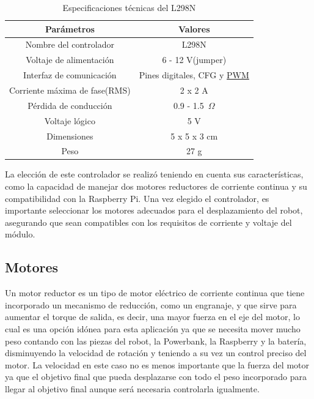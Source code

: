 \begin{table}[H]
\begin{center}
\begin{tabular}{|c|c|}
\hline
\textbf{Parámetros} & \textbf{Valores} \\
\hline
Nombre del controlador & L298N \\
Voltaje de alimentación & 6 - 12 V(jumper) \\
Interfaz de comunicación & Pines digitales, CFG y \hyperlink{PWM}{PWM} \\
Corriente máxima de fase(RMS) & 2 x 2 A \\
Pérdida de conducción & 0.9 - 1.5~$\Omega$ \\
Voltaje lógico & 5 V \\
Dimensiones & 5 x 5 x 3 cm \\
Peso & 27 g \\
\hline
\end{tabular}
\caption{Especificaciones técnicas del L298N}
\label{cuadro:ejemplo}
\end{center}
\end{table}

La elección de este controlador se realizó teniendo en cuenta sus características, como la capacidad de manejar dos motores reductores de corriente continua y su compatibilidad con la Raspberry Pi. Una vez elegido el controlador, es importante seleccionar los motores adecuados para el desplazamiento del robot, asegurando que sean compatibles con los requisitos de corriente y voltaje del módulo.

\subsection{Motores}
\label{subsec:motores}

Un motor reductor es un tipo de motor eléctrico de corriente continua que tiene incorporado un mecanismo de reducción, como un engranaje, y que sirve para aumentar el torque de salida, es decir, una mayor fuerza en el eje del motor, lo cual es una opción idónea para esta aplicación ya que se necesita mover mucho peso contando con las piezas del robot, la Powerbank, la Raspberry y la batería, disminuyendo la velocidad de rotación y teniendo a su vez un control preciso del motor. La velocidad en este caso no es menos importante que la fuerza del motor ya que el objetivo final que pueda desplazarse con todo el peso incorporado para llegar al objetivo final aunque será necesaria controlarla igualmente. \\

